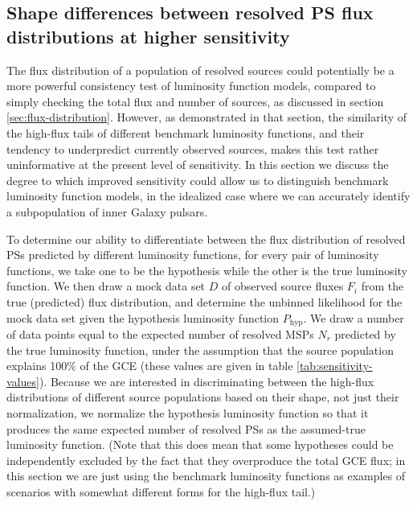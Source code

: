 \documentclass[letter,11pt]{article}
\begin{document}
\subsection{Shape differences between resolved PS flux distributions at higher sensitivity}

The flux distribution of a population of resolved sources could potentially be a more powerful consistency test of luminosity function models, compared to simply checking the total flux and number of sources, as discussed in section \ref{sec:flux-distribution}. However, as demonstrated in that section, the similarity of the high-flux tails of different benchmark luminosity functions, and their tendency to underpredict currently observed sources, makes this test rather uninformative at the present level of sensitivity. In this section we discuss the degree to which improved sensitivity could allow us to distinguish benchmark luminosity function models, in the idealized case where we can accurately identify a subpopulation of inner Galaxy pulsars.

To determine our ability to differentiate between the flux distribution of resolved PSs predicted by different luminosity functions, for every pair of luminosity functions, we take one to be the hypothesis while the other is the true luminosity function. We then draw a mock data set $D$ of observed source fluxes $F_i$ from the true (predicted) flux distribution, and determine the unbinned likelihood for the mock data set given the hypothesis luminosity function $P_\text{hyp}$. We draw a number of data points equal to the expected number of resolved MSPs $N_r$ predicted by the true luminosity function, under the assumption that the source population explains 100\% of the GCE (these values are given in table \ref{tab:sensitivity-values}). Because we are interested in discriminating between the high-flux distributions of different source populations based on their shape, not just their normalization, we normalize the hypothesis luminosity function so that it produces the same expected number of resolved PSs as the assumed-true luminosity function. (Note that this does mean that some hypotheses could be independently excluded by the fact that they overproduce the total GCE flux; in this section we are just using the benchmark luminosity functions as examples of scenarios with somewhat different forms for the high-flux tail.)
\end{document}
